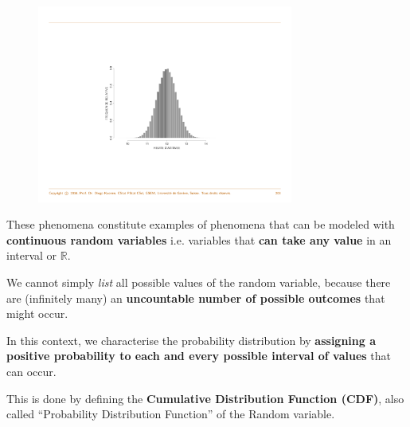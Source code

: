 \documentclass[notes=show,smaller,handout]{beamer}\usepackage[]{graphicx}\usepackage[]{color}
\begin{document}
\begin{frame}{\secname}
  \begin{example}[continued]
  \begin{figure}
  \includegraphics[width=0.75\textwidth,height=0.75\textheight]{img/hist3.pdf}
  \end{figure}
  \end{example}
\end{frame}


%
%
%


\begin{frame}{\secname}
  These phenomena constitute examples of phenomena that can be modeled with
  \textbf{continuous random variables} i.e.
  variables that \textbf{can take any value} in an interval or $\mathbb{R}$. \\ \bigskip

  We cannot simply \emph{list} all possible values of the
  random variable, because there are (infinitely many) an
  \textbf{uncountable number of possible outcomes} that might occur. \\ \bigskip

  In this context, we characterise the probability distribution by  \textbf{assigning a positive probability to each and every possible interval of values} that can occur. \\ \bigskip

  This is done by defining the \textbf{Cumulative Distribution Function (CDF)}, also called ``Probability Distribution Function'' of the Random variable.
\end{frame}
\end{document}
